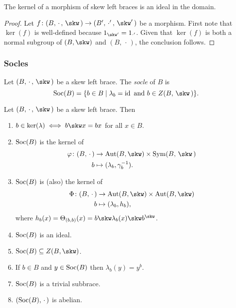 \begin{prop}
    The kernel of a morphism of skew left braces is an ideal in the domain.
\end{prop}

\begin{proof}
    Let $f\colon(B,\,\cdot\,,\,\skw\,)\to(B',\,\cdot'\,,\,\skw'\,)$ be a morphism. First note that $\ker(f)$ is well-defined because $1_{\skw'}=1_{\cdot'}$. Given that $\ker(f)$ is both a normal subgroup of $(B,\skw)$ and $(B,\,\cdot\,)$, the conclusion follows. 
\end{proof}

\subsubsection*{Socles}

\begin{defn}
    Let $(B,\,\cdot\,,\,\skw\,)$ be a skew left brace. The \textsl{socle\/} of $B$ is
    $$
        \Soc(B) = \set{b\in B\mid \lambda_b=\id\text{ and }
            b\in Z(B,\,\skw\,)}.
    $$
\end{defn}

\begin{thm}
    Let\/ $(B,\,\cdot\,,\,\skw\,)$ be a skew left brace. Then
    \begin{enumerate}[\rm a)]
        \item $b\in\ker(\lambda)\iff b\skw x=bx$ for all\/ $x\in B$.
        \item ${\rm Soc}(B)$ is the kernel of
            \begin{align*}
                \varphi\colon(B,\,\cdot\,)
                    &\to\Aut(B,\skw)\times\Sym(B,\,\skw\,)\\
                b
                    &\mapsto(\lambda_b,\gamma_b^{-1}).
            \end{align*}
        \item ${\rm Soc}(B)$ is (also) the kernel of
            \begin{align*}
                \Phi\colon(B,\,\cdot\,)&\to\Aut(B,\skw)\times\Aut(B,\skw)\\
                    b&\mapsto(\lambda_b,h_b),
            \end{align*}
            where\/ $h_b(x)=\Theta_{(b,b)}(x)=b\skw\lambda_b(x)\skw b^\skw$.
        \item ${\rm Soc}(B)$ is an ideal.
        \item $\Soc(B)\subseteq Z(B,\skw)$.
        \item If\/ $b\in B$ and\/ $y\in{\rm Soc}(B)$ then\/ $\lambda_b(y)= y^b$.
        \item ${\rm Soc}(B)$ is a trivial subbrace.
        \item $({\rm Soc}(B),\,\cdot\,)$ is abelian.
    \end{enumerate}
\end{thm}

